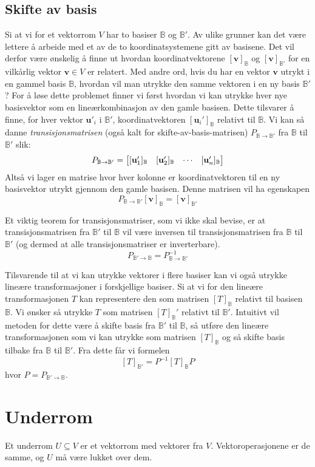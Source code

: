 \documentclass[12pt,a4paper,norsk]{article}
\makeatletter
\newcommand{\B}{\mathbb{B}}
\newcommand{\mat}[2]{\left[\begin{array}{@{}#1@{}}#2\end{array}\right]}
\newcommand{\vv}{\textbf{v}}
\newcommand{\vu}{\textbf{u}}
\makeatother
\begin{document}
\subsection{Skifte av basis}
Si at vi for et vektorrom $V$ har to basiser $\B$ og $\B'$. Av ulike grunner kan det være lettere å arbeide med et av de to koordinatsystemene gitt av basisene. Det vil derfor være ønskelig å finne ut hvordan koordinatvektorene $[\vv]_\B$ og $[\vv]_{\B'}$ for en vilkårlig vektor $\vv \in V$ er relatert.
Med andre ord, hvis du har en vektor $\vv$ utrykt i en gammel basis $\B$, hvordan vil man utrykke den samme vektoren i en ny basis $\B'$?
For å løse dette problemet finner vi først hvordan vi kan utrykke hver nye basisvektor som en lineærkombinasjon av den gamle basisen. Dette tilsvarer å finne, for hver vektor $\vu'_i$ i $\B'$, koordinatvektoren $[\vu_i']_\B$ relativt til $\B$. Vi kan så danne \textit{transisjonsmatrisen} (også kalt for skifte-av-basis-matrisen)  $P_{\B\rightarrow\B'}$ fra $\B$ til $\B'$ slik:
\[P_{\B\rightarrow\B'} = \mat{cccc}{[\vu_1']_\B & [\vu_2']_\B & \cdots & [\vu_n']_\B}\]
Altså vi lager en matrise hvor hver kolonne er koordinatvektoren til en ny basisvektor utrykt gjennom den gamle basisen. Denne matrisen vil ha egenskapen
\[P_{\B\rightarrow\B'}[\vv]_\B = [\vv]_{\B'}\]

Et viktig teorem for transisjonsmatriser, som vi ikke skal bevise, er at transisjonsmatrisen fra $\B'$ til $\B$ vil være inversen til transisjonsmatrisen fra $\B$ til $\B'$ (og dermed at alle transisjonsmatriser er inverterbare).
\[P_{\B'\rightarrow\B} = P_{\B\rightarrow\B'}^{-1}\]

Tilsvarende til at vi kan utrykke vektorer i flere basiser kan vi også utrykke lineære transformasjoner i forskjellige basiser. Si at vi for den lineære transformasjonen $T$ kan representere den som matrisen $[T]_\B$ relativt til basisen $\B$. Vi ønsker så utrykke $T$ som matrisen $[T]_\B'$ relativt til $\B'$. Intuitivt vil metoden for dette være å skifte basis fra $\B'$ til $\B$, så utføre den lineære transformasjonen som vi kan utrykke som matrisen $[T]_\B$ og så skifte basis tilbake fra $\B$ til $\B'$. Fra dette får vi formelen
\[[T]_{\B'}=P^{-1}[T]_\B P\]
hvor $P=P_{\B'\rightarrow\B}$.

\section{Underrom}
Et underrom $U \subseteq V$ er et vektorrom med vektorer fra $V$.
Vektoroperasjonene er de samme, og $U$ må være lukket over dem.
\end{document}
